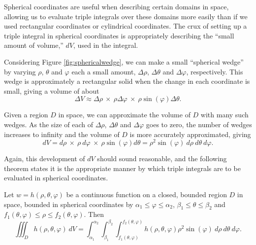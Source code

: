 Spherical coordinates are useful when describing certain domains in space, allowing us to evaluate triple integrals over these domains more easily than if we used rectangular coordinates or cylindrical coordinates. The crux of setting up a triple integral in spherical coordinates is appropriately describing the ``small amount of volume,'' $dV$, used in the integral.

Considering Figure \ref{fig:sphericalwedge}, we can make a small ``spherical wedge'' by varying $\rho$, $\theta$ and $\varphi$ each a small amount, $\Delta\rho$, $\Delta\theta$ and $\Delta\varphi$, respectively. This wedge is approximately a rectangular solid when the change in each coordinate is small, giving a volume of about
$$\Delta V \approx \Delta\rho\ \times\ \rho\Delta\varphi\ \times\ \rho\sin(\varphi)\Delta\theta.$$

Given a region $D$ in space, we can approximate the volume of $D$ with many such wedges. As the size of each of $\Delta\rho$, $\Delta\theta$ and $\Delta\varphi$ goes to zero, the number of wedges increases to infinity and the volume of $D$ is more accurately approximated, giving
$$dV = d\rho\ \times\ \rho\ d\varphi\ \times\ \rho\sin(\varphi)d\theta = \rho^2\sin(\varphi)\ d\rho\ d\theta\ d\varphi.$$

Again, this development of $dV$ should sound reasonable, and the following theorem states it is the appropriate manner by which triple integrals are to be evaluated in spherical coordinates.

{Let $w=h(\rho,\theta,\varphi)$ be a continuous function on a closed, bounded region $D$ in space, bounded in spherical coordinates by $\alpha_1 \leq \varphi \leq \alpha_2$, $\beta_1 \leq \theta \leq \beta_2$ and $f_1(\theta,\varphi) \leq \rho \leq f_2(\theta,\varphi)$. Then 
$$\iiint_D h(\rho,\theta,\varphi)\ dV = \int_{\alpha_1}^{\alpha_2}\int_{\beta_1}^{\beta_2}\int_{f_1(\theta,\varphi)}^{f_2(\theta,\varphi)} h(\rho,\theta,\varphi) \rho^2\sin(\varphi)\ d\rho\ d\theta\ d\varphi.$$
}

